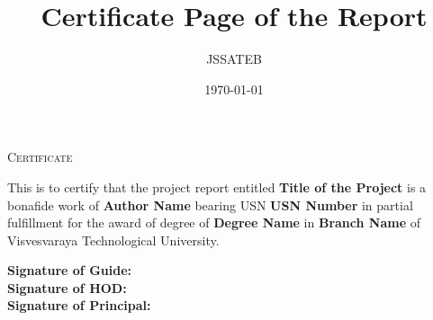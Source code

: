 \documentclass{article}
\title{Certificate Page of the Report}
\author{JSSATEB}
\date{\today}
\begin{document}
\begin{titlepage}
    \centering
    {\scshape\LARGE Certificate\par}
    \vspace{1cm}
    This is to certify that the project report entitled \textbf{Title of the Project} is a bonafide work of \textbf{Author Name} bearing USN \textbf{USN Number} in partial fulfillment for the award of degree of \textbf{Degree Name} in \textbf{Branch Name} of Visvesvaraya Technological University.
    \vspace{2cm}
    
    \begin{flushleft}
    \textbf{Signature of Guide:} \\
    \vspace{2cm}
    \textbf{Signature of HOD:} \\
    \vspace{2cm}
    \textbf{Signature of Principal:}
    \end{flushleft}
    
\end{titlepage}
\end{document}

